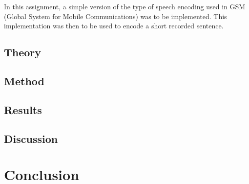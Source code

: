 \documentclass{IEEEtran}
\begin{document}
In this assignment, a simple version of the type of speech encoding used in GSM
(Global System for Mobile Communications) was to be implemented. This
implementation was then to be used to encode a short recorded sentence.

\subsection{Theory}
\subsection{Method}
\subsection{Results}
\subsection{Discussion}

\section{Conclusion}
\end{document}
